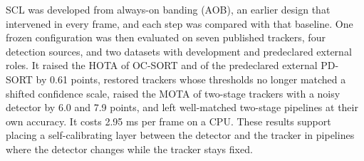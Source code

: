 \documentclass[pdflatex,sn-mathphys-num,iicol]{sn-jnl}
\newcommand{\scl}{SCL}
\newcommand{\aob}{AOB}
\begin{document}
\scl{} was developed from always-on banding (\aob{}), an earlier design that
intervened in every frame, and each step was compared with that baseline.
One frozen configuration was then evaluated on seven published trackers, four
detection sources, and two datasets with development and predeclared
external roles. It raised the HOTA of
OC-SORT and of the predeclared external PD-SORT by 0.61 points, restored
trackers whose thresholds no longer matched a shifted confidence scale, raised
the MOTA of two-stage trackers with a noisy detector by 6.0 and 7.9 points,
and left well-matched two-stage pipelines at their own accuracy. It costs
2.95 ms per frame on a CPU. These results support placing a self-calibrating
layer between the detector and the tracker in pipelines where the detector
changes while the tracker stays fixed.

\backmatter

\end{document}
